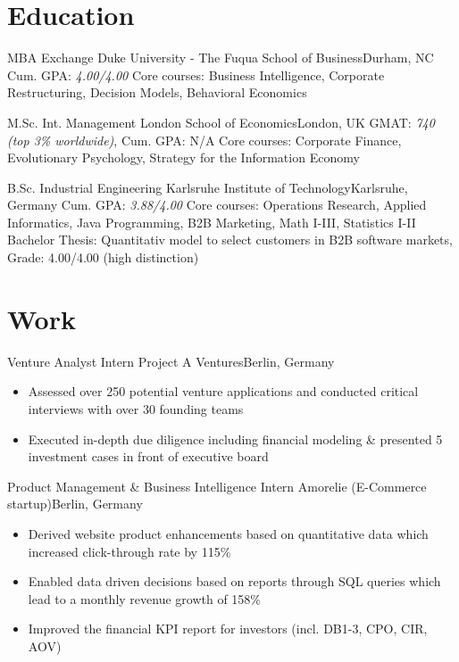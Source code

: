 \documentclass{my_cv}
\begin{document}
\makecvtitle

\section{Education}

{MBA Exchange}
{Duke University - The Fuqua School of Business}{Durham, NC}
{Cum. GPA: \textit{4.00/4.00}}
{Core courses: Business Intelligence, Corporate Restructuring, Decision Models, Behavioral Economics}  %

{M.Sc. Int. Management}
{London School of Economics}{London, UK}
{GMAT: \textit{740 (top 3\% worldwide)}, Cum. GPA: N/A}
{Core courses: Corporate Finance, Evolutionary Psychology, Strategy for the Information Economy}  %

{B.Sc. Industrial Engineering}
{Karlsruhe Institute of Technology}{Karlsruhe, Germany}
{Cum. GPA: \textit{3.88/4.00}}
{Core courses: Operations Research, Applied Informatics, Java Programming, B2B Marketing, Math I-III, Statistics I-II \\
Bachelor Thesis: Quantitativ model to select customers in B2B software markets, Grade: 4.00/4.00 (high distinction)
}  %

\section{Work}
{Venture Analyst Intern}
{Project A Ventures}{Berlin, Germany}
{}
{
\begin{itemize}
\item Assessed over 250 potential venture applications and conducted critical interviews with over 30 founding teams
\item Executed in-depth due diligence including financial modeling \& presented 5 investment cases in front of executive board
\end{itemize}
}  %

{Product Management \& Business Intelligence Intern}
{Amorelie (E-Commerce startup)}{Berlin, Germany}
{}
{
\begin{itemize}
\item Derived website product enhancements based on quantitative data which increased click-through rate by 115\%
\item Enabled data driven decisions based on reports through SQL queries which lead to a monthly revenue growth of 158\%
\item Improved the financial KPI report for investors (incl. DB1-3, CPO, CIR, AOV)
\end{itemize}
}  %
\end{document}
